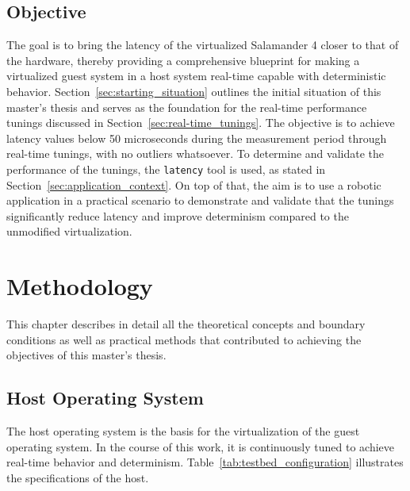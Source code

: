 \documentclass[MMR,Master,english]{twbook}
\begin{document}
\section{Objective}
The goal is to bring the latency of the virtualized Salamander 4 closer to that of the hardware, thereby providing a comprehensive blueprint for making a virtualized guest system in a host system real-time capable with deterministic behavior. Section~\ref{sec:starting_situation} outlines the initial situation of this master's thesis and serves as the foundation for the real-time performance tunings discussed in Section~\ref{sec:real-time_tunings}. The objective is to achieve latency values below 50 microseconds during the measurement period through real-time tunings, with no outliers whatsoever. To determine and validate the performance of the tunings, the \texttt{latency} tool is used, as stated in Section~\ref{sec:application_context}. On top of that, the aim is to use a robotic application in a practical scenario to demonstrate and validate that the tunings significantly reduce latency and improve determinism compared to the unmodified virtualization.

\clearpage
\chapter{Methodology}\label{cha:methodology}

This chapter describes in detail all the theoretical concepts and boundary conditions as well as practical methods that contributed to achieving the objectives of this master's thesis.

\section{Host Operating System}\label{sec:host_operating_system}
The host operating system is the basis for the virtualization of the guest operating system. In the course of this work, it is continuously tuned to achieve real-time behavior and determinism. Table~\ref{tab:testbed_configuration} illustrates the specifications of the host.
\end{document}

